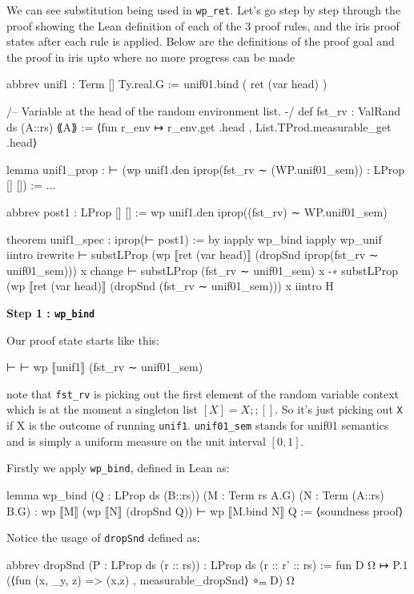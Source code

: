 We can see substitution being used in \texttt{wp\_ret}. Let's go step by step through the proof showing the Lean definition of each of the 3 proof rules, and the iris
proof states after each rule is applied. Below are the definitions of the proof goal and the proof in iris upto where no more progress can be made

\begin{leancode}

abbrev unif1 : Term [] Ty.real.G :=
  unif01.bind (
  ret (var head)
)

/-- Variable at the head of the random environment list. -/
def fst_rv : ValRand ds (A::rs) ⟪A⟫ :=
  ⟨fun r_env ↦ r_env.get .head , List.TProd.measurable_get .head⟩

lemma unif1_prop : ⊢ (wp unif1.den iprop(fst_rv ∼ (WP.unif01_sem)) : LProp [] []) := ...

abbrev post1 : LProp [] [] := wp unif1.den iprop((fst_rv) ∼ WP.unif01_sem)

theorem unif1_spec : iprop(⊢ post1) := by
  iapply wp_bind
  iapply wp_unif
  iintro %
  irewrite ⊢ substLProp (wp ⟦ret (var head)⟧ (dropSnd iprop(fst_rv ∼ unif01_sem))) x
  change ⊢ substLProp (fst_rv ∼ unif01_sem) x -∗
           substLProp (wp ⟦ret (var head)⟧ (dropSnd (fst_rv ∼ unif01_sem))) x
  iintro H
\end{leancode}

\textbf{Step 1 : \texttt{wp\_bind}}

Our proof state starts like this:
\begin{leancode}
⊢ 
⊢ wp ⟦unif1⟧ (fst_rv ∼ unif01_sem)
\end{leancode}

note that \texttt{fst\_rv} is picking out the first element of the random variable context which is at the moment a singleton list $[X] = X ;; []$. So it's just picking out \texttt{X}
if X is the outcome of running \texttt{unif1}. \texttt{unif01\_sem} stands for unif01 semantics
and is simply a uniform measure on the unit interval $[0,1]$.

Firstly we apply \texttt{wp\_bind}, defined in Lean as: 
\begin{leancode}
lemma wp_bind (Q : LProp ds (B::rs)) (M : Term rs A.G) (N : Term (A::rs) B.G) :
    wp ⟦M⟧ (wp ⟦N⟧ (dropSnd Q)) ⊢ wp ⟦M.bind N⟧ Q := ⟨soundness proof⟩ 
\end{leancode}

Notice the usage of \texttt{dropSnd} defined as:

\begin{leancode}
abbrev dropSnd (P : LProp ds (r :: rs)) : LProp ds (r :: r' :: rs) :=
  fun D Ω ↦ P.1 (⟨fun (x, _y, z) => (x,z) , measurable_dropSnd⟩ ∘ₘ D) Ω
\end{leancode}

